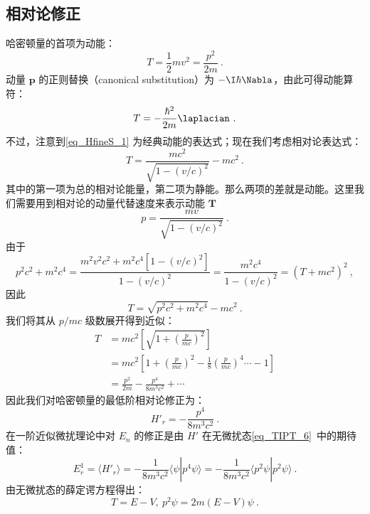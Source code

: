 \subsection{相对论修正}
哈密顿量的首项为动能：
\begin{equation}\label{eq_HfineS_1}
T=\frac{1}{2}mv^2=\frac{p^2}{2m}~.
\end{equation}
动量 $\mathbf p$ 的正则替换（canonical substitution）为 $-\I\hbar\Nabla$，由此可得动能算符：
\begin{equation}
T=-\frac{\hbar^2}{2m}\laplacian~.
\end{equation}
不过，注意到\autoref{eq_HfineS_1} 为经典动能的表达式；现在我们考虑相对论表达式：
\begin{equation}
T=\frac{mc^2}{\sqrt{1-(v/c)^2}}-mc^2~.
\end{equation}
其中的第一项为总的相对论能量，第二项为静能。那么两项的差就是动能。这里我们需要用到相对论的动量代替速度来表示动能 $\mathbf T$
\begin{equation}
p=\frac{mv}{\sqrt{1-(v/c)^2}}~.
\end{equation}
由于
\begin{equation}
p^2c^2+m^2c^4=\frac{m^2v^2c^2+m^2c^4[1-(v/c)^2]}{1-(v/c)^2}=\frac{m^2c^4}{1-(v/c)^2}=(T+mc^2)^2~,
\end{equation}
因此
\begin{equation}
T=\sqrt{p^2c^2+m^2c^4}-mc^2~.
\end{equation}
我们将其从 $p/mc$ 级数展开得到近似：
\begin{align}
T &= mc^2\left[\sqrt{1+\left(\frac{p}{mc}\right)^2}\right]\\ 
&=mc^2\left[1+\left(\frac{p}{mc}\right)^2-\frac{1}{8}\left(\frac{p}{mc}\right)^4\cdots -1\right]\\
&=\frac{p^2}{2m}-\frac{p^4}{8m^3c^2}+\cdots~
\end{align}
因此我们对哈密顿量的最低阶相对论修正为：
\begin{equation}
H'_r=-\frac{p^4}{8m^3c^2}~.
\end{equation}
在一阶近似微扰理论中对 $E_n$ 的修正是由 $H'$ 在无微扰态\autoref{eq_TIPT_6}~中的期待值：
\begin{equation}\label{eq_HfineS_16}
E_r^1=\langle H'_r\rangle=-\frac{1}{8m^3c^2}\langle\psi|p^4\psi\rangle=-\frac{1}{8m^3c^2}\langle p^2\psi|p^2\psi\rangle~.
\end{equation}
由无微扰态的薛定谔方程得出：
\begin{equation}
T=E-V, \ p^2\psi = 2m(E-V)\psi~.
\end{equation}
